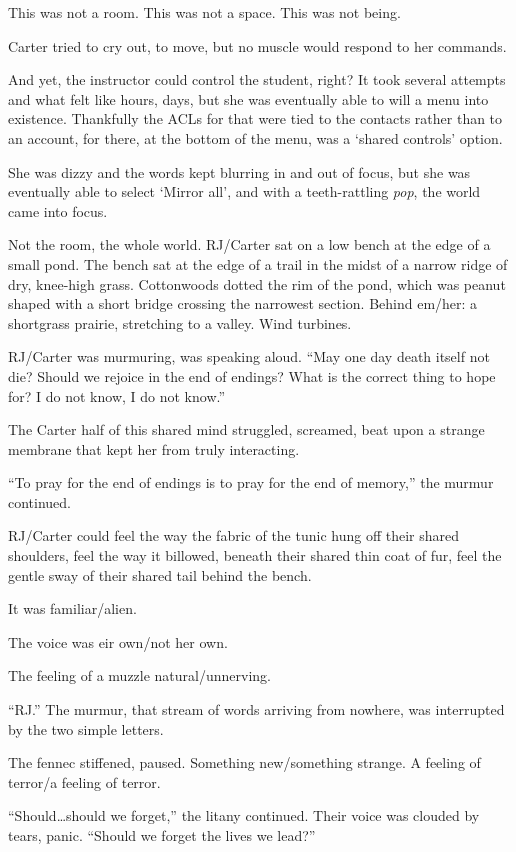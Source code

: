 This was not a room. This was not a space. This was not being.

Carter tried to cry out, to move, but no muscle would respond to her commands.

And yet, the instructor could control the student, right? It took several attempts and what felt like hours, days, but she was eventually able to will a menu into existence. Thankfully the ACLs for that were tied to the contacts rather than to an account, for there, at the bottom of the menu, was a `shared controls' option.

She was dizzy and the words kept blurring in and out of focus, but she was eventually able to select `Mirror all', and with a teeth-rattling \emph{pop}, the world came into focus.

Not the room, the whole world. RJ/Carter sat on a low bench at the edge of a small pond. The bench sat at the edge of a trail in the midst of a narrow ridge of dry, knee-high grass. Cottonwoods dotted the rim of the pond, which was peanut shaped with a short bridge crossing the narrowest section. Behind em/her: a shortgrass prairie, stretching to a valley. Wind turbines.

RJ/Carter was murmuring, was speaking aloud. ``May one day death itself not die? Should we rejoice in the end of endings? What is the correct thing to hope for? I do not know, I do not know.''

The Carter half of this shared mind struggled, screamed, beat upon a strange membrane that kept her from truly interacting.

``To pray for the end of endings is to pray for the end of memory,'' the murmur continued.

RJ/Carter could feel the way the fabric of the tunic hung off their shared shoulders, feel the way it billowed, beneath their shared thin coat of fur, feel the gentle sway of their shared tail behind the bench.

It was familiar/alien.

The voice was eir own/not her own.

The feeling of a muzzle natural/unnerving.

``RJ.'' The murmur, that stream of words arriving from nowhere, was interrupted by the two simple letters.

The fennec stiffened, paused. Something new/something strange. A feeling of terror/a feeling of terror.

``Should\ldots{}should we forget,'' the litany continued. Their voice was clouded by tears, panic. ``Should we forget the lives we lead?''

